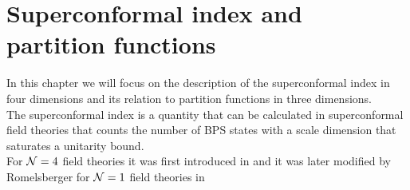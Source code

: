 

\chapter{Superconformal index and partition functions}

In this chapter we will focus on the description of the superconformal index in four dimensions and its relation to partition functions in three dimensions.\\
The superconformal index is a quantity that can be calculated in superconformal field theories that counts the number of BPS states with a scale dimension that saturates a unitarity bound.\\
For $\mathcal{N}=4$ field theories it was first introduced in \cite{Kinney:2005ej}
and it was later modified by Romelsberger for $\mathcal{N}=1$ field theories in \cite{Romelsberger:2005eg}





